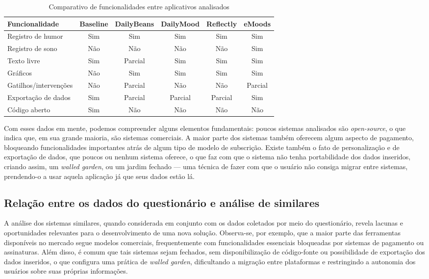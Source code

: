 \begin{table}[H]
    \centering
    \caption{Comparativo de funcionalidades entre aplicativos analisados}
    \label{tab:comparativo_apps}
    \begin{tabular}{|l|c|c|c|c|c|}
        \hline
        Funcionalidade &
        Baseline &
        DailyBeans &
        DailyMood &
        Reflectly &
        eMoods \\

        \hline
        Registro de humor & Sim & Sim & Sim & Sim & Sim \\
        \hline
        Registro de sono & Não & Não & Não & Não & Sim \\
        \hline
        Texto livre & Sim & Parcial & Sim & Sim & Sim \\
        \hline
        Gráficos & Não & Sim & Sim & Sim & Sim \\
        \hline
        Gatilhos/intervenções & Não & Parcial & Não & Não & Parcial \\
        \hline
        Exportação de dados & Sim & Parcial & Parcial & Parcial & Sim \\
        \hline
        Código aberto & Sim & Não & Não & Não & Não \\
        \hline
    \end{tabular}
\end{table}

Com esses dados em mente, podemos compreender alguns elementos fundamentais:
poucos sistemas analisados são \textit{open-source}, o que indica que, em sua
grande maioria, são sistemas comerciais. A maior parte dos sistemas também
oferecem algum aspecto de pagamento, bloqueando funcionalidades importantes
atrás de algum tipo de modelo de subscrição. Existe também o fato de
personalização e de exportação de dados, que poucos ou nenhum sistema oferece,
o que faz com que o sistema não tenha portabilidade dos dados inseridos,
criando assim, um \textit{walled garden}, ou um jardim fechado --- uma técnica de
fazer com que o usuário não consiga migrar entre sistemas, prendendo-o a usar
aquela aplicação já que seus dados estão lá.

\subsection{Relação entre os dados do questionário e análise de similares}

A análise dos sistemas similares, quando considerada em conjunto com os dados
coletados por meio do questionário, revela lacunas e oportunidades relevantes
para o desenvolvimento de uma nova solução. Observa-se, por exemplo, que a
maior parte das ferramentas disponíveis no mercado segue modelos comerciais,
frequentemente com funcionalidades essenciais bloqueadas por sistemas de
pagamento ou assinaturas. Além disso, é comum que tais sistemas sejam fechados,
sem disponibilização de código-fonte ou possibilidade de exportação dos dados
inseridos, o que configura uma prática de \textit{walled garden}, dificultando
a migração entre plataformas e restringindo a autonomia dos usuários sobre suas
próprias informações.

